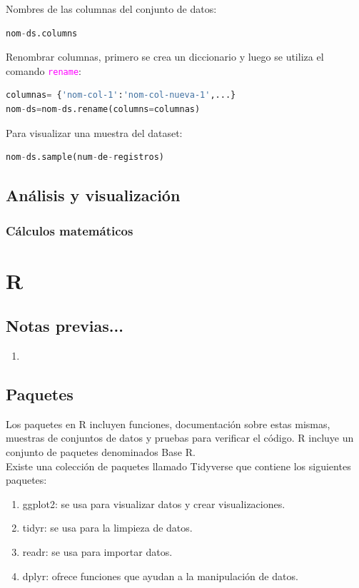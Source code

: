 \documentclass[a4paper, 12pt]{book}
\begin{document}



Nombres de las columnas del conjunto de datos:
\begin{lstlisting}[language=Python]
nom-ds.columns
\end{lstlisting}

Renombrar columnas, primero se crea un diccionario y luego se utiliza el comando \texttt{\textcolor{magenta}{rename}}:
\begin{lstlisting}[language=Python]
columnas= {'nom-col-1':'nom-col-nueva-1',...}
nom-ds=nom-ds.rename(columns=columnas)
\end{lstlisting}

Para visualizar una muestra del dataset:
\begin{lstlisting}[language=Python]
nom-ds.sample(num-de-registros)
\end{lstlisting}



\section{Análisis y visualización}
\subsection{Cálculos matemáticos}


%
\chapter{R}
\section{Notas previas...}
\begin{enumerate}
\item 
\end{enumerate}
\section{Paquetes}
Los paquetes en R incluyen funciones, documentación sobre estas mismas, muestras de conjuntos de datos y pruebas para verificar el código. R incluye un conjunto de paquetes denominados Base R. \\
Existe una colección de paquetes llamado Tidyverse que contiene los siguientes paquetes:
\begin{enumerate}
\item ggplot2: se usa para visualizar datos y crear visualizaciones.
\item tidyr: se usa para la limpieza de datos.
\item readr: se usa para importar datos.
\item dplyr: ofrece funciones que ayudan a la manipulación de datos.
\end{enumerate}
\end{document}
